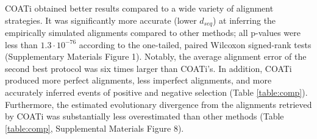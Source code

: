 \documentclass[12pt,letterpaper]{article}
\begin{document}

COATi obtained better results compared to a wide variety of alignment strategies. It was significantly more accurate (lower $d_{seq}$) at inferring the empirically simulated alignments compared to other methods; all p-values were less than $1.3 \cdot 10^{-76}$ according to the one-tailed, paired Wilcoxon signed-rank tests (Supplementary Materials Figure 1). Notably, the average alignment error of the second best protocol was six times larger than COATi's. In addition, COATi produced more perfect alignments, less imperfect alignments, and more accurately inferred events of positive and negative selection (Table \ref{table:comp}). Furthermore, the estimated evolutionary divergence from the alignments retrieved by COATi was substantially less overestimated than other methods (Table \ref{table:comp}, Supplemental Materials Figure 8).
\end{document}
